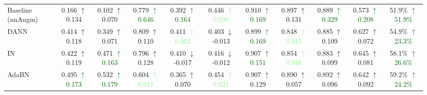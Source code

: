 \begin{table}[ht]
{\begin{tabular}{lcccccccccc}
			Baseline (nnAugm) & 0.166 \textcolor{medGreen}{$\uparrow$0.134} & 0.102 \textcolor{medGreen}{$\uparrow$0.070} & 0.779 \textcolor{darkGreen}{$\uparrow$0.646} & 0.392 \textcolor{darkGreen}{$\uparrow$0.164} & 0.446 \textcolor{lightGreen}{$\uparrow$0.020} & 0.910 \textcolor{darkGreen}{$\uparrow$0.169} & 0.897 \textcolor{medGreen}{$\uparrow$0.131} & 0.889 \textcolor{darkGreen}{$\uparrow$0.329} & 0.573 \textcolor{darkGreen}{$\uparrow$0.208} & 51.9\% \textcolor{darkGreen}{$\uparrow$51.9\%} \\  %
			DANN        & 0.414 \textcolor{medGreen}{$\uparrow$0.118} & 0.349 \textcolor{medGreen}{$\uparrow$0.071} & 0.809 \textcolor{medGreen}{$\uparrow$0.110} & 0.411 \textcolor{lightGreen}{$\uparrow$0.002} & 0.403 \textcolor{lightRed}{$\downarrow$-0.013} & 0.899 \textcolor{darkGreen}{$\uparrow$0.169} & 0.848 \textcolor{lightGreen}{$\uparrow$0.015} & 0.885 \textcolor{medGreen}{$\uparrow$0.109} & 0.627 \textcolor{medGreen}{$\uparrow$0.072} & 54.9\% \textcolor{darkGreen}{$\uparrow$23.3\%} \\
			
			IN          & 0.422 \textcolor{medGreen}{$\uparrow$0.119} & 0.471 \textcolor{darkGreen}{$\uparrow$0.163} & 0.796 \textcolor{medGreen}{$\uparrow$0.128} & 0.410 \textcolor{lightRed}{$\downarrow$-0.017} & 0.416 \textcolor{lightRed}{$\downarrow$-0.012} & 0.907 \textcolor{darkGreen}{$\uparrow$0.151} & 0.854 \textcolor{lightGreen}{$\uparrow$0.016} & 0.883 \textcolor{medGreen}{$\uparrow$0.099} & 0.645 \textcolor{medGreen}{$\uparrow$0.081} & 58.1\% \textcolor{darkGreen}{$\uparrow$26.6\%} \\
			AdaBN       & 0.495 \textcolor{darkGreen}{$\uparrow$0.173} & 0.532 \textcolor{darkGreen}{$\uparrow$0.179} & 0.604 \textcolor{lightGreen}{$\uparrow$0.017} & 0.365 \textcolor{medGreen}{$\uparrow$0.070} & 0.454 \textcolor{lightGreen}{$\uparrow$0.021} & 0.907 \textcolor{medGreen}{$\uparrow$0.129} & 0.890 \textcolor{medGreen}{$\uparrow$0.057} & 0.892 \textcolor{medGreen}{$\uparrow$0.096} & 0.642 \textcolor{medGreen}{$\uparrow$0.092} & 59.2\% \textcolor{darkGreen}{$\uparrow$24.2\%} \\
			

\end{tabular}}
\end{table}
